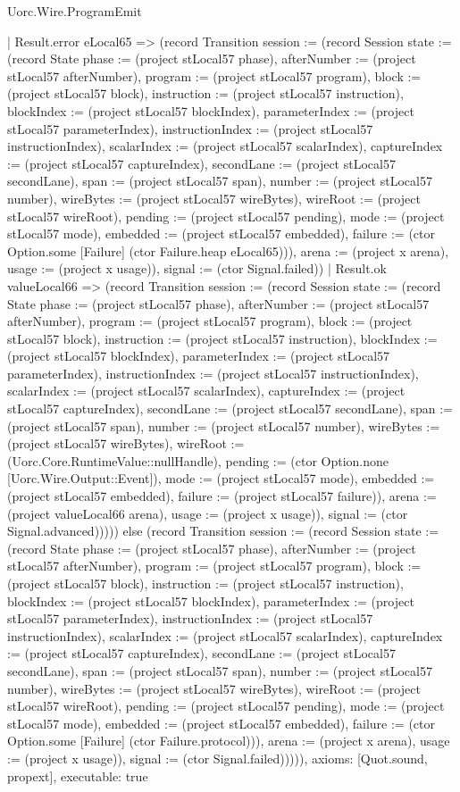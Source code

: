 \begin{lexlean}{Uorc.Wire.ProgramEmit}
\begin{semanticmodule}
{      | Result.error eLocal65 => (record Transition {session := (record Session {state := (record State {phase := (project stLocal57 phase), afterNumber := (project stLocal57 afterNumber), program := (project stLocal57 program), block := (project stLocal57 block), instruction := (project stLocal57 instruction), blockIndex := (project stLocal57 blockIndex), parameterIndex := (project stLocal57 parameterIndex), instructionIndex := (project stLocal57 instructionIndex), scalarIndex := (project stLocal57 scalarIndex), captureIndex := (project stLocal57 captureIndex), secondLane := (project stLocal57 secondLane), span := (project stLocal57 span), number := (project stLocal57 number), wireBytes := (project stLocal57 wireBytes), wireRoot := (project stLocal57 wireRoot), pending := (project stLocal57 pending), mode := (project stLocal57 mode), embedded := (project stLocal57 embedded), failure := (ctor Option.some [Failure] (ctor Failure.heap eLocal65))}), arena := (project x arena), usage := (project x usage)}), signal := (ctor Signal.failed)})
      | Result.ok valueLocal66 => (record Transition {session := (record Session {state := (record State {phase := (project stLocal57 phase), afterNumber := (project stLocal57 afterNumber), program := (project stLocal57 program), block := (project stLocal57 block), instruction := (project stLocal57 instruction), blockIndex := (project stLocal57 blockIndex), parameterIndex := (project stLocal57 parameterIndex), instructionIndex := (project stLocal57 instructionIndex), scalarIndex := (project stLocal57 scalarIndex), captureIndex := (project stLocal57 captureIndex), secondLane := (project stLocal57 secondLane), span := (project stLocal57 span), number := (project stLocal57 number), wireBytes := (project stLocal57 wireBytes), wireRoot := (Uorc.Core.RuntimeValue::nullHandle), pending := (ctor Option.none [Uorc.Wire.Output::Event]), mode := (project stLocal57 mode), embedded := (project stLocal57 embedded), failure := (project stLocal57 failure)}), arena := (project valueLocal66 arena), usage := (project x usage)}), signal := (ctor Signal.advanced)})))) else (record Transition {session := (record Session {state := (record State {phase := (project stLocal57 phase), afterNumber := (project stLocal57 afterNumber), program := (project stLocal57 program), block := (project stLocal57 block), instruction := (project stLocal57 instruction), blockIndex := (project stLocal57 blockIndex), parameterIndex := (project stLocal57 parameterIndex), instructionIndex := (project stLocal57 instructionIndex), scalarIndex := (project stLocal57 scalarIndex), captureIndex := (project stLocal57 captureIndex), secondLane := (project stLocal57 secondLane), span := (project stLocal57 span), number := (project stLocal57 number), wireBytes := (project stLocal57 wireBytes), wireRoot := (project stLocal57 wireRoot), pending := (project stLocal57 pending), mode := (project stLocal57 mode), embedded := (project stLocal57 embedded), failure := (ctor Option.some [Failure] (ctor Failure.protocol))}), arena := (project x arena), usage := (project x usage)}), signal := (ctor Signal.failed)})))),
  axioms: [Quot.sound, propext],
  executable: true
}


\end{semanticmodule}
\end{lexlean}
